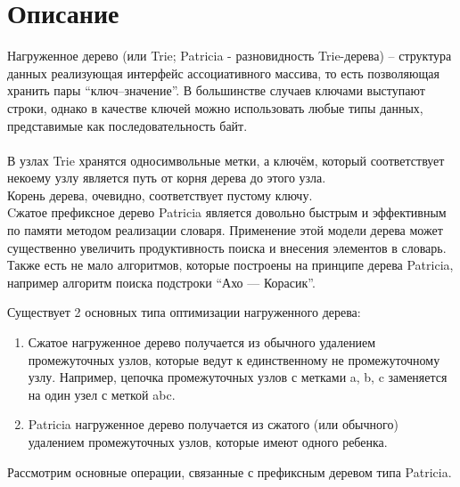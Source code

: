 \documentclass[pdf, unicode, 12pt, a4paper,oneside,fleqn]{article}
\begin{document}
\section{Описание}
Нагруженное дерево (или Trie; Patricia - разновидность Trie-дерева) -- структура данных реализующая интерфейс ассоциативного массива, то есть позволяющая хранить пары \enquote{ключ--значение}. В большинстве случаев ключами выступают строки, однако в качестве ключей можно использовать любые типы данных, представимые как последовательность байт.\\ \\
В узлах Trie хранятся односимвольные метки, а ключём, который соответствует некоему узлу является путь от корня дерева до этого узла.\\
Корень дерева, очевидно, соответствует пустому ключу.\\ 

Cжатое префиксное дерево Patricia является довольно быстрым и эффективным по памяти методом реализации словаря. Применение этой модели дерева может существенно увеличить продуктивность поиска и внесения элементов в словарь. Также есть не мало алгоритмов, которые построены на принципе дерева Patricia, например алгоритм поиска подстроки \enquote{Ахо — Корасик}.

Существует 2 основных типа оптимизации нагруженного дерева:
\begin{enumerate}
\item Сжатое нагруженное дерево получается из обычного удалением промежуточных узлов, которые ведут к единственному не промежуточному узлу. Например, цепочка промежуточных узлов с метками a, b, c заменяется на один узел с меткой abc.
\item Patricia нагруженное дерево получается из сжатого (или обычного) удалением промежуточных узлов, которые имеют одного ребенка.
\end{enumerate}
Рассмотрим основные операции, связанные с префиксным деревом типа Patricia.\\
\pagebreak
\setcounter{subsection}{1}
\end{document}
